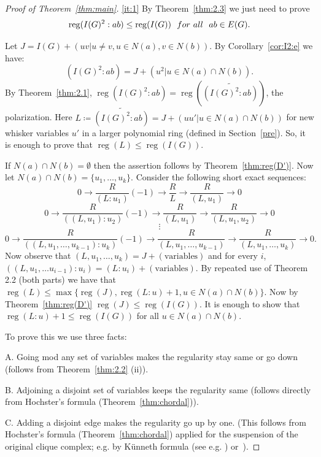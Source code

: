 \documentclass[10pt]{article}
\theoremstyle{definition}
\numberwithin{equation}{section}
\newcommand \reg{\operatorname{reg}}
\begin{document}




\begin{proof}[Proof of Theorem~\ref{thm:main}]
\ref{it:1} By Theorem~\ref{thm:2.3} we just need to prove
\begin{equation}\label{eq:I(G)^2:ab}
\reg(I(G)^2:ab)\leq \reg(I(G))\ \ {\rm for\  all\ \ } ab \in E(G).
\end{equation}

Let $J=I(G) +(uv|u\neq v, u \in N(a),v\in N(b))$. By Corollary~\ref{cor:I2:e}
we have:$$(I(G)^2:ab)=J+(u^2| u \in N(a) \cap N(b)).$$
By Theorem~\ref{thm:2.1}, $\reg(I(G)^2:ab)  = \reg(\widetilde{(I(G)^2:ab)})$, the polarization. Here $L\coloneqq\widetilde{(I(G)^2:ab)}=
J+(uu'| u \in N(a) \cap N(b))$
for new whisker variables $u'$
 in a larger polynomial ring (defined in Section~\ref{pre}).
So, it is enough to prove that $\reg(L) \leq \reg(I(G))$.


 If $N(a) \cap N(b)=\emptyset$ then the assertion follows by Theorem~\ref{thm:reg(D')}. Now let $N(a) \cap N(b)=\{u_1, \ldots, u_k\}$. Consider the following short exact sequences:
$$0 \longrightarrow \frac{R}{(L:u_1)} (-1) \rightarrow \frac{R}{L} \rightarrow \frac{R}{(L,u_1)} \rightarrow 0$$
$$0 \longrightarrow \frac{R}{((L, u_1):u_2)} (-1) \rightarrow \frac{R}{(L, u_1)} \rightarrow \frac{R}{(L,u_1,u_2)} \rightarrow 0$$
$$\vdots$$
$$0 \longrightarrow \frac{R}{((L,u_1,\ldots ,u_{k-1}):u_k)} (-1) \rightarrow \frac{R}{(L, u_1, \ldots , u_{k-1})} \rightarrow \frac{R}{(L,u_1,\ldots ,u_k)} \rightarrow 0.$$
  Now observe that $(L,u_1,\ldots ,u_k)=J+(\text{variables})$ and for every $i$,  $((L,u_1,\ldots u_{i-1}):u_i)=(L:u_i)+ (\text{variables})$. By repeated use of Theorem 2.2 (both parts) we have that $\reg (L) \leq \max \{ \reg (J), \reg(L:u)+1, u\in N(a) \cap N(b)\}$. Now by Theorem~\ref{thm:reg(D')} $\reg(J) \leq \reg(I(G))$. It is enough to show that $ \reg(L:u)+1 \leq \reg(I(G))$ for all $u \in N(a) \cap N(b)$.

 To prove this we use three facts:

 A. Going mod any set of variables  makes the regularity stay same or go down (follows from Theorem~\ref{thm:2.2} (ii)).

 B. Adjoining a disjoint set of variables keeps the regularity same  (follows directly from Hochster's formula (Theorem~\ref{thm:chordal})).

 C. Adding a disjoint edge makes the regularity go up by one. (This follows from Hochster's formula (Theorem~\ref{thm:chordal}) applied for the suspension of the original clique complex; e.g. by K\"unneth formula (see e.g. \cite[9.12]{ABJ}) or~\cite[Lemma.8]{russ}).


\end{proof}
\end{document}
